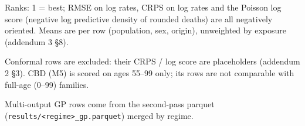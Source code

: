 {\begin{minipage}{\linewidth}
\noindent Ranks: 1 = best; RMSE on log rates, CRPS on log rates and the Poisson log score (negative log predictive density of rounded deaths) are all negatively oriented. Means are per row (population, sex, origin), unweighted by exposure (addendum 3 \S8).\par
\noindent Conformal rows are excluded: their CRPS / log score are placeholders (addendum 2 \S3). CBD (M5) is scored on ages 55--99 only; its rows are not comparable with full-age (0--99) families.\par
\noindent Multi-output GP rows come from the second-pass parquet (\texttt{results/<regime>\_gp.parquet}) merged by regime.\par
\end{minipage}}
